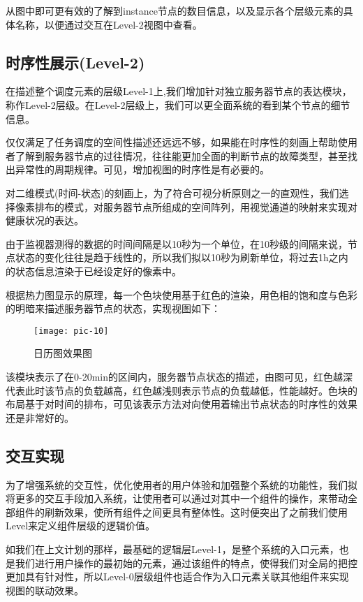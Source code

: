 从图中即可更有效的了解到instance节点的数目信息，以及显示各个层级元素的具体名称，以便通过交互在Level-2视图中查看。

\newpage
\subsection{时序性展示(Level-2)}

在描述整个调度元素的层级Level-1上,我们增加针对独立服务器节点的表达模块，称作Level-2层级。在Level-2层级上，我们可以更全面系统的看到某个节点的细节信息。

仅仅满足了任务调度的空间性描述还远远不够，如果能在时序性的刻画上帮助使用者了解到服务器节点的过往情况，往往能更加全面的判断节点的故障类型，甚至找出异常性的周期规律。可见，增加视图的时序性是有必要的。

对二维模式(时间-状态)的刻画上，为了符合可视分析原则之一的直观性，我们选择像素排布的模式，对服务器节点所组成的空间阵列，用视觉通道的映射来实现对健康状况的表达。

由于监视器测得的数据的时间间隔是以10秒为一个单位，在10秒级的间隔来说，节点状态的变化往往是趋于线性的，所以我们拟以10秒为刷新单位，将过去1h之内的状态信息渲染于已经设定好的像素中。

根据热力图显示的原理，每一个色块使用基于红色的渲染，用色相的饱和度与色彩的明暗来描述服务器节点的状态，实现视图如下：

\begin{figure}[h]
	\centering
	\texttt{[image: pic-10]}
	\caption{日历图效果图}
	\label{pic-10}
\end{figure}

该模块表示了在0-20min的区间内，服务器节点状态的描述，由图可见，红色越深代表此时该节点的负载越高，红色越浅则表示节点的负载越低，性能越好。色块的布局基于对时间的排布，可见该表示方法对向使用着输出节点状态的时序性的效果还是非常好的。

\subsection{交互实现}
为了增强系统的交互性，优化使用者的用户体验和加强整个系统的功能性，我们拟将更多的交互手段加入系统，让使用者可以通过对其中一个组件的操作，来带动全部组件的刷新效果，使所有组件之间更具有整体性。这时便突出了之前我们使用Level来定义组件层级的逻辑价值。

如我们在上文计划的那样，最基础的逻辑层Level-1，是整个系统的入口元素，也是我们进行用户操作的最初始的元素，通过该组件的特点，使得我们对全局的把控更加具有针对性，所以Level-0层级组件也适合作为入口元素关联其他组件来实现视图的联动效果。

